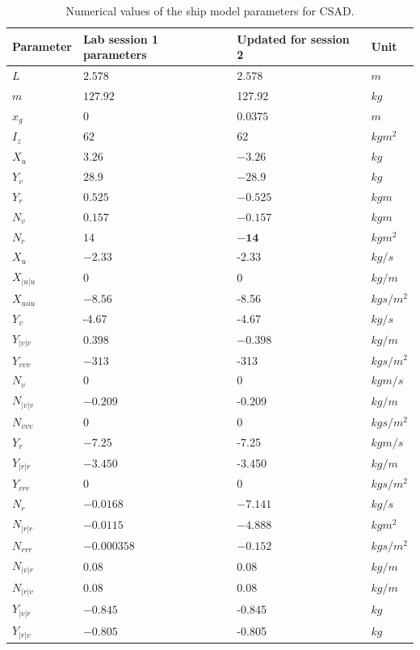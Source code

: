 \begin{table}[h!]
\centering 
\begin{tabular}{| p{2cm} | p{2cm} | p{3cm} | p{2cm}|}
\hline
\textbf{Parameter}& \textbf{Lab session 1 parameters } &  \textbf{Updated for session 2} &\textbf{Unit}   \\ \hline\hline
$L$ & $2.578$ & $2.578$ & $m$  \\ \hline
$m$ & $127.92$ &127.92 & $kg$ \\ \hline
$x_g$ & $0$ & $\boldsymbol{0.0375}$ & $m$  \\ \hline
$I_z$ & $62$& 62 & $kgm^2$  \\ \hline
$X_{\dot{u}}$ &$3.26$& $\boldsymbol{-3.26}$ & $kg $ \\ \hline
$Y_{\dot{v}}$ &$28.9$& $\boldsymbol{-28.9}$ & $kg$  \\ \hline
$Y_{\dot{r}}$ & $0.525$ & $\boldsymbol{-0.525}$ & $kgm$  \\ \hline
$N_{\dot{v}}$ &$0.157$ &$\boldsymbol{-0.157}$ & $kgm$ \\ \hline
$N_{\dot{r}}$ & $14$ &$\boldsymbol{-14}$ & $kgm^2$  \\ \hline
$X_u$ & $ -2.33$ &-2.33 &$kg/s$  \\ \hline
$X_{|u|u}$ & $0$ &0& $kg/m $ \\ \hline
$X_{uuu}$ & $-8.56$ & -8.56&$kgs/m^2$  \\ \hline
$Y_v$ & -4.67 &-4.67 &$kg/s$\\ \hline
$Y_{|v|v}$ & $0.398$ & $\boldsymbol{-0.398}$ & $kg/m$\\ \hline
$Y_{vvv}$ & $-313$ & -313& $kgs/m^2$\\ \hline
$N_v$ & $0$ & 0 &$kgm/s$\\ \hline
$N_{|v|v}$ & $-0.209$ &-0.209 & $kg/m$\\ \hline
$N_{vvv}$ & $0$&0 & $kgs/m^2$\\ \hline
$Y_r$ & $-7.25$ &-7.25 &$kgm/s$\\ \hline
$Y_{|r|r}$ & $-3.450$&-3.450 & $kg/m$\\ \hline
$Y_{rrr}$ & $0$&0 & $kgs/m^2$\\ \hline
$N_r$ & $-0.0168$ & $\boldsymbol{-7.141}$ &$kg/s$\\ \hline
$N_{|r|r}$ & $-0.0115$&$ \boldsymbol{-4.888} $& $kgm^2$\\ \hline
$N_{rrr}$ & $-0.000358$&$\boldsymbol{-0.152}$ & $kgs/m^2$\\ \hline
$N_{|v|r}$ & $0.08$&0.08 & $kg/m$\\ \hline
$N_{|r|v}$ & $0.08$& 0.08& $kg/m$\\ \hline
$Y_{|v|r}$ & $-0.845$ &-0.845 &$kg$\\ \hline
$Y_{|r|v}$ & $-0.805$ & -0.805&$kg$\\ \hline
\end{tabular}
\caption{Numerical values of the ship model parameters for CSAD.}
\label{CSADParameters}
\end{table}


